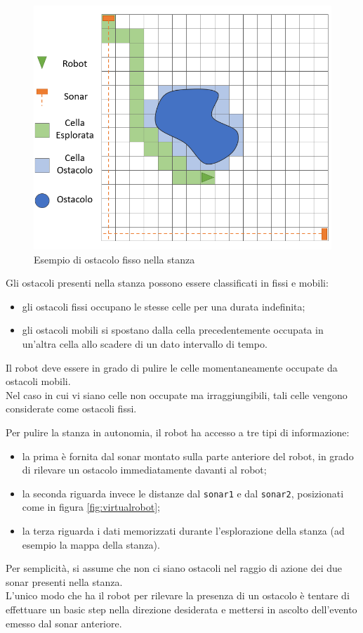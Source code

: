 \documentclass{llncs}
\newcommand{\code}[1]{{\color{blue}\small{\texttt{#1}}}}
\begin{document}
\begin{figure}
	\centering
	\includegraphics[scale=0.5]{img/obstacle.PNG}
	\caption{Esempio di ostacolo fisso nella stanza}
	\label{fig:obstacles}
\end{figure}

Gli ostacoli presenti nella stanza possono essere classificati in fissi e mobili:
\begin{itemize}
	\setlength\itemsep{0em}
	\item gli ostacoli fissi occupano le stesse celle per una durata indefinita;
	\item gli ostacoli mobili si spostano dalla cella precedentemente occupata in un'altra cella allo scadere di un dato intervallo di tempo.
\end{itemize}
Il robot deve essere in grado di pulire le celle momentaneamente occupate da ostacoli mobili. \\
Nel caso in cui vi siano celle non occupate ma irraggiungibili, tali celle vengono considerate come ostacoli fissi.

Per pulire la stanza in autonomia, il robot ha accesso a tre tipi di informazione:
\begin{itemize}
	\setlength\itemsep{0em}
	\item la prima è fornita dal sonar montato sulla parte anteriore del robot, in grado di rilevare un ostacolo immediatamente davanti al robot;
	\item la seconda riguarda invece le distanze dal \code{sonar1} e dal \code{sonar2}, posizionati come in figura \ref{fig:virtualrobot};
	\item la terza riguarda i dati memorizzati durante l'esplorazione della stanza (ad esempio la mappa della stanza).
\end{itemize}
Per semplicità, si assume che non ci siano ostacoli nel raggio di azione dei due sonar presenti nella stanza. \\
L'unico modo che ha il robot per rilevare la presenza di un ostacolo è tentare di effettuare un basic step nella direzione desiderata e mettersi in ascolto dell'evento emesso dal sonar anteriore.
\end{document}
